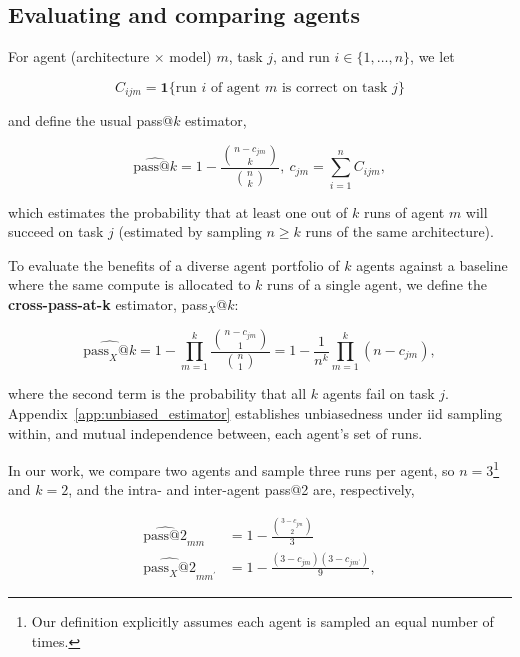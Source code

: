 \documentclass{article}
\begin{document}
\subsection{Evaluating and comparing agents}
\label{sec:agent-evals}

For agent (architecture $\times$ model) $m$, task $j$, and run $i \in \{1,\dots,n\}$, we let

\begin{equation}
C_{ijm}
=
\mathbf{1}
\{
\text{run } i \text{ of agent } m \text{ is correct on task } j \}
\end{equation}

and define the usual pass@$k$ estimator, 

\begin{equation}
\widehat{\text{pass@}k} = 1 - \frac{\binom{n-c_{jm}}{k}}{\binom{n}{k}}, \ c_{jm} = \sum_{i=1}^n C_{ijm},
\end{equation}

which estimates the probability that at least one out of $k$ runs of agent $m$ will succeed on task $j$ (estimated by sampling $n \geq k$ runs of the same architecture). 

To evaluate the benefits of a diverse agent portfolio of $k$ agents against a baseline where the same compute is allocated to $k$ runs of a single agent, we define the \textbf{cross-pass-at-k} estimator, pass$_X$@$k$:

\begin{equation}
\widehat{\text{pass}_{X}\text{@}k} = 1 - \prod_{m=1}^k \frac{\binom{n-c_{jm}}{1}}{\binom{n}{1}} = 1 - \frac{1}{n^k}\prod_{m=1}^k ({n-c_{jm}}),
\label{eq:cross-pass-at-k}
\end{equation}

where the second term is the probability that all $k$ agents fail on task $j$. Appendix~\ref{app:unbiased_estimator} establishes unbiasedness under iid sampling within, and mutual independence between, each agent's set of runs.

In our work, we compare two agents and sample three runs per agent, so $n=3$\footnote{Our definition explicitly assumes each agent is sampled an equal number of times.} and $k=2$, and the intra- and inter-agent pass@2 are, respectively,

\begin{align}
    \widehat{\text{pass@2}}_{mm} &= 1 - \frac{\binom{3-c_{jm}}{2}}{3}  \label{eq:intra-pass2}\\
    \widehat{\text{pass}_{X}\text{@}2}_{mm^\prime} &= 1 - \frac{(3-c_{jm})(3-c_{jm^\prime})}{9},
    \label{eq:special-case}
\end{align}
\end{document}
